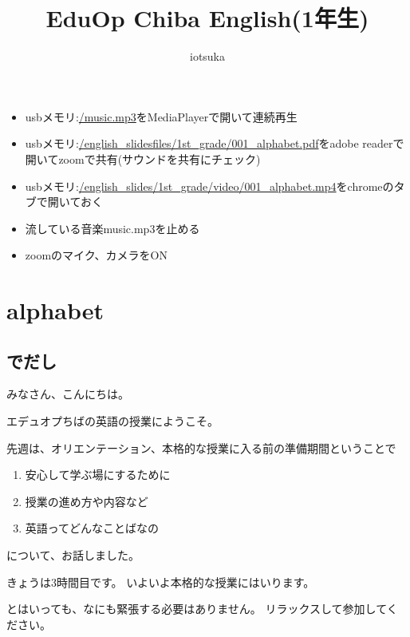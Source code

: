 \documentclass[12pt]{jlreq}
\begin{document}
\thispagestyle{empty}
\title{EduOp Chiba English(1年生)}
\author{iotsuka}
\maketitle

\begin{tcolorbox}[title=いちばんはじめに]
\begin{itemize}
 \item usbメモリ:\url{/music.mp3}をMediaPlayerで開いて連続再生
 \item usbメモリ:\url{/english_slidesfiles/1st_grade/001_alphabet.pdf}をadobe readerで開いてzoomで共有(サウンドを共有にチェック)
 \item usbメモリ:\url{/english_slides/1st_grade/video/001_alphabet.mp4}をchromeのタブで開いておく
\end{itemize}
\end{tcolorbox}


\begin{tcolorbox}[title=授業の直前に]
\begin{itemize}
 \item 流している音楽music.mp3を止める
 \item zoomのマイク、カメラをON
\end{itemize}
\end{tcolorbox}

\tableofcontents
\newpage\setcounter{page}{1}
\section{alphabet}
\subsection{でだし}
みなさん、こんにちは。

エデュオプちばの英語の授業にようこそ。

先週は、オリエンテーション、本格的な授業に入る前の準備期間ということで
\begin{enumerate}
 \item 安心して学ぶ場にするために
 \item 授業の進め方や内容など
 \item 英語ってどんなことばなの
\end{enumerate}
について、お話しました。

きょうは3時間目です。
いよいよ本格的な授業にはいります。

とはいっても、なにも緊張する必要はありません。
リラックスして参加してください。
\end{document}
